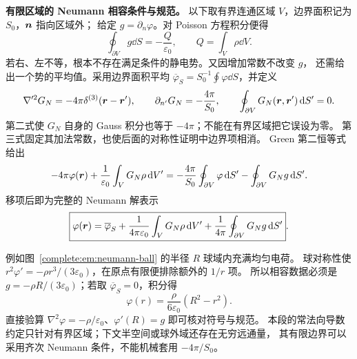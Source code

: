 \noindent\textbf{有限区域的 Neumann 相容条件与规范。}
以下取有界连通区域 $V$，边界面积记为 $S_0$，$\bm{n}$ 指向区域外；
给定 $g=\partial_n\varphi$。对 Poisson 方程积分便得
\[
 \boxed{\oint_{\partial V}g\dd S=-\frac Q{\varepsilon_0}},
 \qquad Q=\int_V\rho\dd V.
\]
若右、左不等，根本不存在满足条件的静电势。又因增加常数不改变 $g$，
还需给出一个势的平均值。采用边界面积平均
$\overline\varphi_S=S_0^{-1}\oint\varphi\dd S$，并定义
\[
 \nabla'^2G_N=-4\pi\delta^{(3)}(\bm{r}-\bm{r}'),\qquad
 \partial_{n'}G_N=-\frac{4\pi}{S_0},\qquad
 \oint_{\partial V}G_N(\bm{r},\bm{r}')\mathop{}\!\mathrm d S'=0.
\]
第二式使 $G_N$ 自身的 Gauss 积分也等于 $-4\pi$；不能在有界区域把它误设为零。
第三式固定其加法常数，也使后面的对称性证明中边界项相消。
Green 第二恒等式给出
\[
 -4\pi\varphi(\bm{r})+\frac1{\varepsilon_0}\int_VG_N\rho\mathop{}\!\mathrm d V'
 =-\frac{4\pi}{S_0}\oint_{\partial V}\varphi\mathop{}\!\mathrm d S'
 -\oint_{\partial V}G_Ng\mathop{}\!\mathrm d S'.
\]
移项后即为完整的 Neumann 解表示
\[
 \boxed{\varphi(\bm{r})=\overline\varphi_S
 +\frac1{4\pi\varepsilon_0}\int_VG_N\rho\mathop{}\!\mathrm d V'
 +\frac1{4\pi}\oint_{\partial V}G_Ng\mathop{}\!\mathrm d S'}.
\]

\begin{qualityfigure}
\end{qualityfigure}

例如图~\ref{complete:em:neumann-ball} 的半径 $R$ 球域内充满均匀电荷。
球对称性使 $r^2\varphi'=-\rho r^3/(3\varepsilon_0)$，在原点有限便排除额外的 $1/r$ 项。
所以相容数据必须是 $g=-\rho R/(3\varepsilon_0)$；若取
$\overline\varphi_S=0$，积分得
\[
 \varphi(r)=\frac{\rho}{6\varepsilon_0}(R^2-r^2).
\]
直接验算 $\nabla^2\varphi=-\rho/\varepsilon_0$、$\varphi'(R)=g$ 即可核对符号与规范。
本段的常法向导数约定只针对有界区域；下文半空间或球外域还存在无穷远通量，
其有限边界可以采用齐次 Neumann 条件，不能机械套用 $-4\pi/S_0$。


